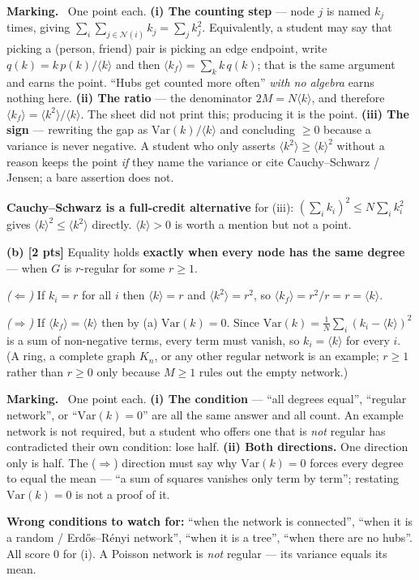 \documentclass[a4paper, 11pt]{extarticle}
\newenvironment{grading}
  {\begin{tcolorbox}[colback=pltblue!4, colframe=pltblue!35, boxrule=0.5pt,
                     sharp corners, boxsep=2pt, left=6pt, right=6pt,
                     top=4pt, bottom=4pt]\footnotesize\textbf{Marking.}\ }
  {\end{tcolorbox}}
\begin{document}
\begin{grading}
One point each.
\textbf{(i) The counting step} --- node $j$ is named $k_j$ times, giving
$\sum_i \sum_{j \in \mathcal{N}(i)} k_j = \sum_j k_j^2$. Equivalently, a
student may say that picking a (person, friend) pair is picking an edge
endpoint, write $q(k) = k\,p(k)/\langle k \rangle$ and then
$\langle k_f \rangle = \sum_k k\,q(k)$; that is the same argument and earns the
point. ``Hubs get counted more often'' \emph{with no algebra} earns nothing
here.
\textbf{(ii) The ratio} --- the denominator $2M = N\langle k \rangle$, and
therefore $\langle k_f \rangle = \langle k^2 \rangle/\langle k \rangle$. The
sheet did not print this; producing it is the point.
\textbf{(iii) The sign} --- rewriting the gap as
$\mathrm{Var}(k)/\langle k \rangle$ and concluding $\ge 0$ because a variance
is never negative. A student who only asserts $\langle k^2\rangle \ge \langle
k\rangle^2$ without a reason keeps the point \emph{if} they name the variance
or cite Cauchy--Schwarz / Jensen; a bare assertion does not.

\textbf{Cauchy--Schwarz is a full-credit alternative} for (iii):
$(\sum_i k_i)^2 \le N \sum_i k_i^2$ gives $\langle k \rangle^2 \le \langle k^2
\rangle$ directly. $\langle k \rangle > 0$ is worth a mention but not a point.
\end{grading}

\textbf{(b) [2 pts]} Equality holds \textbf{exactly when every node has the
same degree} --- when $G$ is $r$-regular for some $r \ge 1$.

\emph{($\Leftarrow$)} If $k_i = r$ for all $i$ then $\langle k \rangle = r$ and
$\langle k^2 \rangle = r^2$, so
$\langle k_f \rangle = r^2 / r = r = \langle k \rangle$.

\emph{($\Rightarrow$)} If $\langle k_f \rangle = \langle k \rangle$ then by (a)
$\mathrm{Var}(k) = 0$. Since
$\mathrm{Var}(k) = \frac{1}{N}\sum_i (k_i - \langle k \rangle)^2$ is a sum of
non-negative terms, every term must vanish, so $k_i = \langle k \rangle$ for
every $i$. (A ring, a complete graph $K_n$, or any other regular network is an
example; $r \ge 1$ rather than $r \ge 0$ only because $M \ge 1$ rules out the
empty network.)

\begin{grading}
One point each.
\textbf{(i) The condition} --- ``all degrees equal'', ``regular network'', or
``$\mathrm{Var}(k) = 0$'' are all the same answer and all count. An example
network is not required, but a student who offers one that is \emph{not}
regular has contradicted their own condition: lose half.
\textbf{(ii) Both directions.} One direction only is half. The
($\Rightarrow$) direction must say why $\mathrm{Var}(k) = 0$ forces every
degree to equal the mean --- ``a sum of squares vanishes only term by term'';
restating $\mathrm{Var}(k) = 0$ is not a proof of it.

\textbf{Wrong conditions to watch for:} ``when the network is connected'',
``when it is a random / Erd\H{o}s--R\'enyi network'', ``when it is a tree'',
``when there are no hubs''. All score 0 for (i). A Poisson network is
\emph{not} regular --- its variance equals its mean.
\end{grading}
\end{document}
